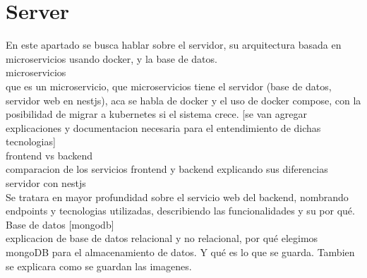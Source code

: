 \section{Server}

En este apartado se busca hablar sobre el servidor, su arquitectura basada en microservicios usando docker, y la base de datos. \\

microservicios \\

que es un microservicio, que microservicios tiene el servidor (base de datos, servidor web en nestjs), aca se habla de docker y el uso de docker compose, con la posibilidad de migrar a kubernetes si el sistema crece. [se van agregar explicaciones y documentacion necesaria para el
        entendimiento de dichas tecnologias] \\

frontend vs backend \\

comparacion de los servicios frontend y backend explicando sus diferencias \\

servidor con nestjs \\

Se tratara en mayor profundidad sobre el servicio web del backend, nombrando endpoints y tecnologias utilizadas, describiendo las funcionalidades y su por qué. \\

Base de datos [mongodb] \\

explicacion de base de datos relacional y no relacional, por qué elegimos mongoDB para el almacenamiento de datos. Y qué es lo que se guarda. Tambien se explicara como se guardan las imagenes. \\
